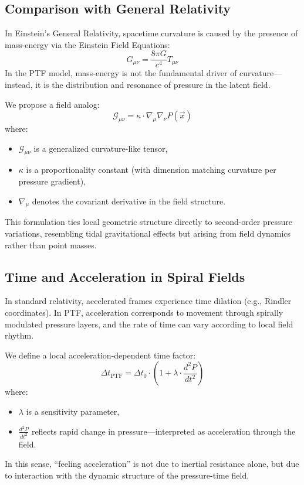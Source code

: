 \documentclass[a4paper,12pt]{article}
\begin{document}
\subsection{Comparison with General Relativity}

In Einstein’s General Relativity, spacetime curvature is caused by the presence of mass-energy via the Einstein Field Equations:
\[
G_{\mu\nu} = \frac{8\pi G}{c^4} T_{\mu\nu}
\]
In the PTF model, mass-energy is not the fundamental driver of curvature—instead, it is the distribution and resonance of pressure in the latent field.

We propose a field analog:
\[
\mathcal{G}_{\mu\nu} = \kappa \cdot \nabla_\mu \nabla_\nu P(\vec{x})
\]
where:
\begin{itemize}
    \item \(\mathcal{G}_{\mu\nu}\) is a generalized curvature-like tensor,
    \item \(\kappa\) is a proportionality constant (with dimension matching curvature per pressure gradient),
    \item \(\nabla_\mu\) denotes the covariant derivative in the field structure.
\end{itemize}

This formulation ties local geometric structure directly to second-order pressure variations, resembling tidal gravitational effects but arising from field dynamics rather than point masses.

\subsection{Time and Acceleration in Spiral Fields}

In standard relativity, accelerated frames experience time dilation (e.g., Rindler coordinates). In PTF, acceleration corresponds to movement through spirally modulated pressure layers, and the rate of time can vary according to local field rhythm.

We define a local acceleration-dependent time factor:
\[
\Delta t_{\text{PTF}} = \Delta t_0 \cdot \left(1 + \lambda \cdot \frac{d^2 P}{dt^2}\right)
\]
where:
\begin{itemize}
    \item \(\lambda\) is a sensitivity parameter,
    \item \(\frac{d^2 P}{dt^2}\) reflects rapid change in pressure—interpreted as acceleration through the field.
\end{itemize}

In this sense, “feeling acceleration” is not due to inertial resistance alone, but due to interaction with the dynamic structure of the pressure-time field.
\end{document}
